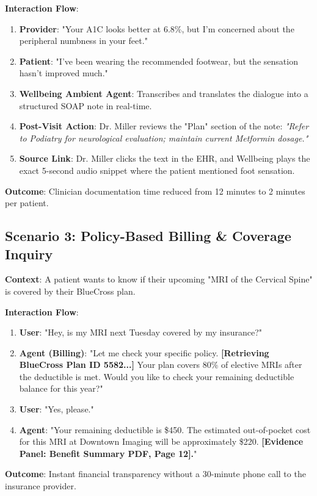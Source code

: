 \documentclass[12pt,a4paper]{article}
\begin{document}
\textbf{Interaction Flow}:
\begin{enumerate}
    \item \textbf{Provider}: "Your A1C looks better at 6.8\%, but I’m concerned about the peripheral numbness in your feet."
    \item \textbf{Patient}: "I've been wearing the recommended footwear, but the sensation hasn't improved much."
    \item \textbf{Wellbeing Ambient Agent}: Transcribes and translates the dialogue into a structured SOAP note in real-time.
    \item \textbf{Post-Visit Action}: Dr. Miller reviews the "Plan" section of the note: \textit{"Refer to Podiatry for neurological evaluation; maintain current Metformin dosage."}
    \item \textbf{Source Link}: Dr. Miller clicks the text in the EHR, and Wellbeing plays the exact 5-second audio snippet where the patient mentioned foot sensation.
\end{enumerate}
\textbf{Outcome}: Clinician documentation time reduced from 12 minutes to 2 minutes per patient.

\subsection{Scenario 3: Policy-Based Billing \& Coverage Inquiry}
\textbf{Context}: A patient wants to know if their upcoming "MRI of the Cervical Spine" is covered by their BlueCross plan.

\textbf{Interaction Flow}:
\begin{enumerate}
    \item \textbf{User}: "Hey, is my MRI next Tuesday covered by my insurance?"
    \item \textbf{Agent (Billing)}: "Let me check your specific policy. \textbf{[Retrieving BlueCross Plan ID 5582...]} Your plan covers 80\% of elective MRIs after the deductible is met. Would you like to check your remaining deductible balance for this year?"
    \item \textbf{User}: "Yes, please."
    \item \textbf{Agent}: "Your remaining deductible is \$450. The estimated out-of-pocket cost for this MRI at Downtown Imaging will be approximately \$220. \textbf{[Evidence Panel: Benefit Summary PDF, Page 12].}"
\end{enumerate}
\textbf{Outcome}: Instant financial transparency without a 30-minute phone call to the insurance provider.
\end{document}
